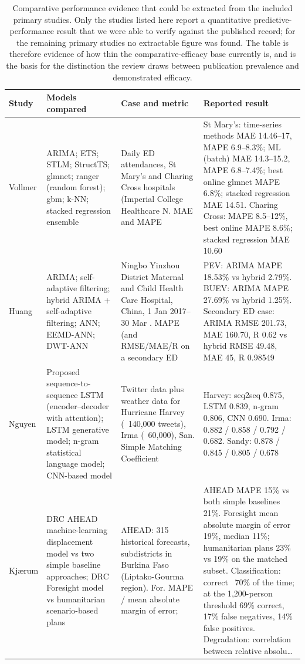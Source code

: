 \begin{table}[htbp!]
\centering
\scriptsize
\caption{Comparative performance evidence that could be extracted from the included primary studies. Only the studies listed here report a quantitative predictive-performance result that we were able to verify against the published record; for the remaining primary studies no extractable figure was found. The table is therefore evidence of how thin the comparative-efficacy base currently is, and is the basis for the distinction the review draws between publication prevalence and demonstrated efficacy.}
\label{tab:efficacy}
\begin{tabular}{@{}p{2.3cm}p{3.5cm}p{2.7cm}p{5.4cm}@{}}
\toprule
\textbf{Study} & \textbf{Models compared} & \textbf{Case and metric} & \textbf{Reported result} \\
\midrule
Vollmer \cite{Vollmer2021ADepartments} & ARIMA; ETS; STLM; StructTS; glmnet; ranger (random forest); gbm; k-NN; stacked regression ensemble & Daily ED attendances, St Mary's and Charing Cross hospitals (Imperial College Healthcare N. MAE and MAPE & St Mary's: time-series methods MAE 14.46--17, MAPE 6.9--8.3\%; ML (batch) MAE 14.3--15.2, MAPE 6.8--7.4\%; best online glmnet MAPE 6.8\%; stacked regression MAE 14.51. Charing Cross: MAPE 8.5--12\%, best online MAPE 8.6\%; stacked regression MAE 10.60 \\[2pt]
Huang \cite{Huang2020MedicalMethod} & ARIMA; self-adaptive filtering; hybrid ARIMA + self-adaptive filtering; ANN; EEMD-ANN; DWT-ANN & Ningbo Yinzhou District Maternal and Child Health Care Hospital, China, 1 Jan 2017--30 Mar . MAPE (and RMSE/MAE/R on a secondary ED & PEV: ARIMA MAPE 18.53\% vs hybrid 2.79\%. BUEV: ARIMA MAPE 27.69\% vs hybrid 1.25\%. Secondary ED case: ARIMA RMSE 201.73, MAE 160.70, R 0.62 vs hybrid RMSE 49.48, MAE 45, R 0.98549 \\[2pt]
Nguyen \cite{Nguyen2022ForecastingNetwork} & Proposed sequence-to-sequence LSTM (encoder--decoder with attention); LSTM generative model; n-gram statistical language model; CNN-based model & Twitter data plus weather data for Hurricane Harvey (~140,000 tweets), Irma (~60,000), San. Simple Matching Coefficient & Harvey: seq2seq 0.875, LSTM 0.839, n-gram 0.806, CNN 0.690. Irma: 0.882 / 0.858 / 0.792 / 0.682. Sandy: 0.878 / 0.845 / 0.805 / 0.678 \\[2pt]
Kj\ae{}rum \cite{Kjaerum2025DisplacementAnticipatory} & DRC AHEAD machine-learning displacement model vs two simple baseline approaches; DRC Foresight model vs humanitarian scenario-based plans & AHEAD: 315 historical forecasts, subdistricts in Burkina Faso (Liptako-Gourma region). For. MAPE / mean absolute margin of error;  & AHEAD MAPE 15\% vs both simple baselines 21\%. Foresight mean absolute margin of error 19\%, median 11\%; humanitarian plans 23\% vs 19\% on the matched subset. Classification: correct ~70\% of the time; at the 1,200-person threshold 69\% correct, 17\% false negatives, 14\% false positives. Degradation: correlation between relative absolu\ldots \\[2pt]

\end{tabular}
\end{table}
